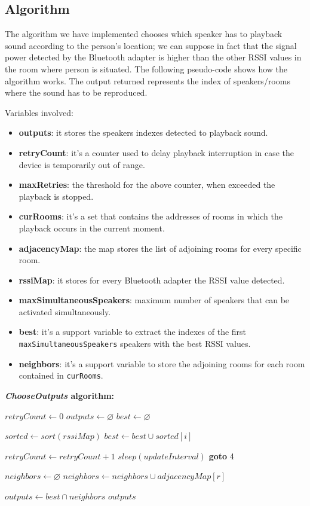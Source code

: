\documentclass[conference]{IEEEtran}
\begin{document}
\subsection{Algorithm}
The algorithm we have implemented chooses which speaker has to playback sound according to the person's location; we can suppose in fact that the signal power detected by the Bluetooth adapter is higher than the other RSSI values in the room where person is situated. The following pseudo-code shows how the algorithm works. The output returned represents the index of speakers/rooms where the sound has to be reproduced.

Variables involved:
\begin{itemize}
\item \textbf{outputs}: it stores the speakers indexes detected to playback sound.
\item \textbf{retryCount}: it's a counter used to delay playback interruption in case the device is temporarily out of range.
\item \textbf{maxRetries}: the threshold for the above counter, when exceeded the playback is stopped.
\item \textbf{curRooms}: it's a set that contains the addresses of rooms in which the playback occurs in the current moment.
\item \textbf{adjacencyMap}: the map stores the list of adjoining rooms for every specific room.
\item \textbf{rssiMap}: it stores for every Bluetooth adapter the RSSI value detected.
\item \textbf{maxSimultaneousSpeakers}: maximum number of speakers that can be activated simultaneously.
\item \textbf{best}: it's a support variable to extract the indexes of the first \texttt{maxSimultaneousSpeakers} speakers with the best RSSI values.
\item \textbf{neighbors}: it's a support variable to store the adjoining rooms for each room contained in \texttt{curRooms}.
\end{itemize}

\vspace{0.3cm}
\textbf{\textit{ChooseOutputs} algorithm:}
\begin{algorithmic}[1]
\STATE $retryCount \gets 0$
\STATE $outputs \gets \varnothing$
\STATE $best \gets \varnothing$

\STATE $sorted \gets sort(rssiMap)$
	\STATE $best \gets best \cup sorted[i]$
\ENDFOR

	\STATE $retryCount \gets retryCount + 1$
	\STATE $sleep(updateInterval)$
	\STATE \textbf{goto} 4
\ENDIF

\STATE $neighbors \gets \varnothing$
	\STATE $neighbors \gets neighbors \cup adjacencyMap[r]$
\ENDFOR

\STATE $outputs \gets best \cap neighbors$
\RETURN $outputs$
\end{algorithmic}
\end{document}
